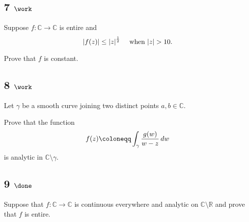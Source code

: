 \hypertarget{work-33}{%
\subsection{\texorpdfstring{7
\(\work\)}{7 \textbackslash work}}\label{work-33}}

Suppose \(f: {\mathbb{C}}\to {\mathbb{C}}\) is entire and
\begin{align*}
{\left\lvert {f(z)} \right\rvert} \leq {\left\lvert {z} \right\rvert}^{1\over 2} \quad\text{ when } {\left\lvert {z} \right\rvert} > 10
.\end{align*}

Prove that \(f\) is constant.

\hypertarget{work-34}{%
\subsection{\texorpdfstring{8
\(\work\)}{8 \textbackslash work}}\label{work-34}}

Let \(\gamma\) be a smooth curve joining two distinct points
\(a, b\in {\mathbb{C}}\).

Prove that the function
\begin{align*}
f(z) \coloneqq\int_\gamma {g(w) \over w-z} \,dw
\end{align*}
is analytic in \({\mathbb{C}}\setminus\gamma\).

\hypertarget{done-1}{%
\subsection{\texorpdfstring{9
\(\done\)}{9 \textbackslash done}}\label{done-1}}

Suppose that \(f: {\mathbb{C}}\to{\mathbb{C}}\) is continuous everywhere
and analytic on \({\mathbb{C}}\setminus {\mathbb{R}}\) and prove that
\(f\) is entire.


